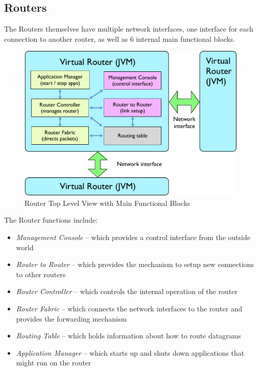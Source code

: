 \subsection{Routers}

The Routers themselves have multiple network interfaces, one interface
for each connection to another router, as well as 6 internal main
functional blocks.

\begin{figure}[h!]
    \centering
    \includegraphics[width=11cm]{images/router-main-blocks}
    \caption{Router Top Level View with Main Functional Blocks}
    \label{design:router-main-blocks}
\end{figure}





The Router functions include:

\begin{itemize}

\item \emph{Management Console} -- which provides a control interface from the
  outside world

\item \emph{Router to Router} -- which provides the mechanism to setup new
  connections to other routers

\item \emph{Router Controller} -- which controls the internal operation of
  the router

\item \emph{Router Fabric} -- which connects the network interfaces to
  the router and provides the forwarding mechanism

\item \emph{Routing Table} -- which holds information about how to
  route datagrams

\item \emph{Application Manager} -- which starts up and shuts down
  applications that might run on the router

\end{itemize}

